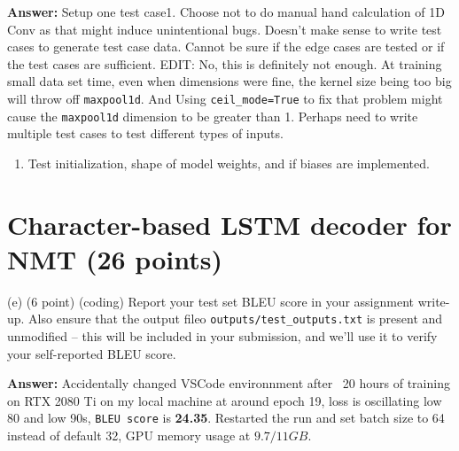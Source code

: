\documentclass{article}
\begin{document}
\bigbreak
\noindent
\textbf{Answer:} Setup one test case1. Choose not to do manual hand calculation of 1D Conv as that might induce unintentional bugs. Doesn't make sense to write test cases to generate test case data.  Cannot be sure if the edge cases are tested or if the test cases are sufficient. EDIT: No, this is definitely not enough. At training small data set time, even when dimensions were fine, the kernel size being too big will throw off \verb|maxpool1d|. And Using \verb|ceil_mode=True| to fix that problem might cause the \verb|maxpool1d| dimension to be greater than 1. Perhaps need to write multiple test cases to test different types of inputs.
\begin{enumerate}
\item Test initialization, shape of model weights, and if biases are implemented.
\end{enumerate}

\section{Character-based LSTM decoder for NMT (26 points)}
\bigbreak
(e) (6 point) (coding) Report your test set BLEU score in your assignment write-up.  Also ensure that the output fileo \verb|outputs/test_outputs.txt| is present and unmodified – this will be included in your submission, and we’ll use it to verify your self-reported BLEU score. 

\bigbreak
\noindent
\textbf{Answer:} Accidentally changed VSCode environnment after ~20 hours of training on RTX 2080 Ti on my local machine at around epoch 19, loss is oscillating low 80 and low 90s, \verb|BLEU score| is \textbf{24.35}. Restarted the run and set batch size to 64 instead of default 32, GPU memory usage at $9.7/11GB$.
\end{document}
